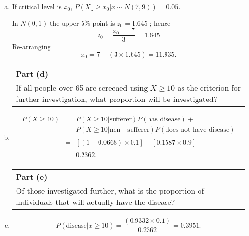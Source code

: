 \documentclass[a4paper,12pt]{article}
\begin{document}
\begin{enumerate}[(a)]
\begin{table}[ht!]
\begin{tabular}{|p{15cm}|}
\\ \hline
 \end{tabular}
\end{table}
\item If critical level is $x_0$, $P(X¸\geq x_0 | x \sim N(7,9))=0.05$.

In $N(0,1)$ the upper 5\% point is $z_0=1.645$ ; hence 
\[z_0 = \frac{x_0\;-\;7}{3} = 1.645 \]
Re-arranging
\[x_0 = 7+(3\times1.645) =
11.935.\]
\newpage

\begin{table}[ht!]
     \centering
     \begin{tabular}{|p{15cm}|}
     \hline        
 \noindent \textbf{Part (d)}\\
\noindent If all people over 65 are screened using $X \geq 10$ as the criterion for further investigation, what proportion will be investigated?
\\ \hline
 \end{tabular}
\end{table}


\item 

\begin{eqnarray*}
P(X\geq 10) &=& 
P(X \geq 10|\mbox{sufferer})P(\mbox{has disease}) +\\ & & P(X \geq 10|\mbox{non - sufferer})P(\mbox{does not have disease})\\
& & \\
&=& \left[(1 - 0.0668) \times 0.1\right] + \left[0.1587 \times 0.9\right]\\
& & \\
&=& 0.2362.\\
\end{eqnarray*}




\newpage

\begin{table}[ht!]
     \centering
     \begin{tabular}{|p{15cm}|}
     \hline        
 \noindent \textbf{Part (e)}\\
\noindent Of those investigated further, what is the proportion of individuals that will actually have the disease?

\\ \hline
 \end{tabular}
\end{table}

\item \[P(\mbox{disease}|x \geq 10)=\frac{(0.9332\times0.1)}{0.2362}=0.3951 .\]
\end{enumerate}
\end{document}
